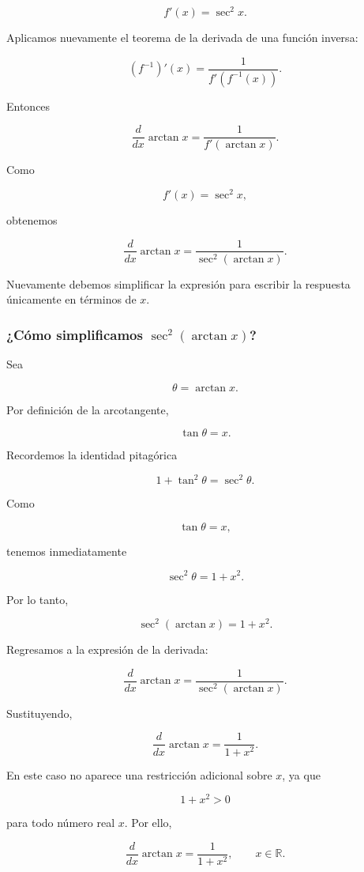 \documentclass[12pt]{article}
\theoremstyle{definition}
\theoremstyle{remark}
\begin{document}
\[
f'(x)=\sec^2x.
\]

Aplicamos nuevamente el teorema de la derivada de una función inversa:

\[
(f^{-1})'(x)
=
\frac{1}{f'(f^{-1}(x))}.
\]

Entonces

\[
\frac{d}{dx}\arctan x
=
\frac{1}{f'(\arctan x)}.
\]

Como

\[
f'(x)=\sec^2x,
\]

obtenemos

\[
\boxed{
\frac{d}{dx}\arctan x
=
\frac{1}{\sec^2(\arctan x)}.
}
\]

Nuevamente debemos simplificar la expresión para escribir la respuesta
únicamente en términos de $x$.

\subsubsection{¿Cómo simplificamos $\sec^2(\arctan x)$?}

Sea

\[
\theta=\arctan x.
\]

Por definición de la arcotangente,

\[
\tan\theta=x.
\]

Recordemos la identidad pitagórica

\[
1+\tan^2\theta=\sec^2\theta.
\]

Como

\[
\tan\theta=x,
\]

tenemos inmediatamente

\[
\sec^2\theta
=
1+x^2.
\]

Por lo tanto,

\[
\boxed{
\sec^2(\arctan x)
=
1+x^2.
}
\]

Regresamos a la expresión de la derivada:

\[
\frac{d}{dx}\arctan x
=
\frac{1}{\sec^2(\arctan x)}.
\]

Sustituyendo,

\[
\boxed{
\frac{d}{dx}\arctan x
=
\frac{1}{1+x^2}.
}
\]

En este caso no aparece una restricción adicional sobre $x$, ya que

\[
1+x^2>0
\]

para todo número real $x$. Por ello,

\[
\boxed{
\frac{d}{dx}\arctan x
=
\frac{1}{1+x^2},
\qquad x\in\mathbb{R}.
}
\]
\end{document}

